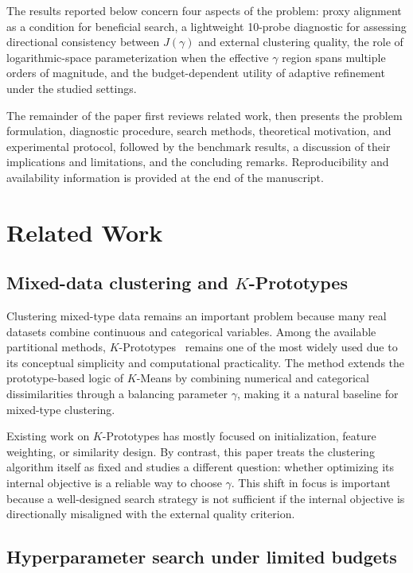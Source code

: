 \documentclass[10pt,lineno]{wlpeerj}
\begin{document}
The results reported below concern four aspects of the problem: proxy alignment as a condition for beneficial search, a lightweight 10-probe diagnostic for assessing directional consistency between $J(\gamma)$ and external clustering quality, the role of logarithmic-space parameterization when the effective $\gamma$ region spans multiple orders of magnitude, and the budget-dependent utility of adaptive refinement under the studied settings.

The remainder of the paper first reviews related work, then presents the problem formulation, diagnostic procedure, search methods, theoretical motivation, and experimental protocol, followed by the benchmark results, a discussion of their implications and limitations, and the concluding remarks. Reproducibility and availability information is provided at the end of the manuscript.

\section*{Related Work}

\subsection*{Mixed-data clustering and $K$-Prototypes}

Clustering mixed-type data remains an important problem because many real datasets combine continuous and categorical variables. Among the available partitional methods, $K$-Prototypes~\citep{huang1997,huang1998} remains one of the most widely used due to its conceptual simplicity and computational practicality. The method extends the prototype-based logic of $K$-Means by combining numerical and categorical dissimilarities through a balancing parameter $\gamma$, making it a natural baseline for mixed-type clustering.

Existing work on $K$-Prototypes has mostly focused on initialization, feature weighting, or similarity design. By contrast, this paper treats the clustering algorithm itself as fixed and studies a different question: whether optimizing its internal objective is a reliable way to choose $\gamma$. This shift in focus is important because a well-designed search strategy is not sufficient if the internal objective is directionally misaligned with the external quality criterion.

\subsection*{Hyperparameter search under limited budgets}
\end{document}
